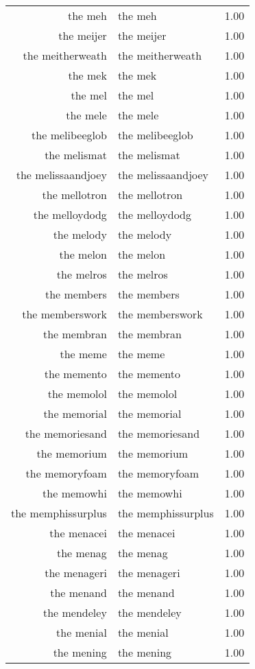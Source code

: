 \begin{table}[ht]
\begin{tabular}{rlr}
  the meh & the meh & 1.00 \\ 
  the meijer & the meijer & 1.00 \\ 
  the meitherweath & the meitherweath & 1.00 \\ 
  the mek & the mek & 1.00 \\ 
  the mel & the mel & 1.00 \\ 
  the mele & the mele & 1.00 \\ 
  the melibeeglob & the melibeeglob & 1.00 \\ 
  the melismat & the melismat & 1.00 \\ 
  the melissaandjoey & the melissaandjoey & 1.00 \\ 
  the mellotron & the mellotron & 1.00 \\ 
  the melloydodg & the melloydodg & 1.00 \\ 
  the melody & the melody & 1.00 \\ 
  the melon & the melon & 1.00 \\ 
  the melros & the melros & 1.00 \\ 
  the members & the members & 1.00 \\ 
  the memberswork & the memberswork & 1.00 \\ 
  the membran & the membran & 1.00 \\ 
  the meme & the meme & 1.00 \\ 
  the memento & the memento & 1.00 \\ 
  the memolol & the memolol & 1.00 \\ 
  the memorial & the memorial & 1.00 \\ 
  the memoriesand & the memoriesand & 1.00 \\ 
  the memorium & the memorium & 1.00 \\ 
  the memoryfoam & the memoryfoam & 1.00 \\ 
  the memowhi & the memowhi & 1.00 \\ 
  the memphissurplus & the memphissurplus & 1.00 \\ 
  the menacei & the menacei & 1.00 \\ 
  the menag & the menag & 1.00 \\ 
  the menageri & the menageri & 1.00 \\ 
  the menand & the menand & 1.00 \\ 
  the mendeley & the mendeley & 1.00 \\ 
  the menial & the menial & 1.00 \\ 
  the mening & the mening & 1.00 \\ 

\end{tabular}
\end{table}
